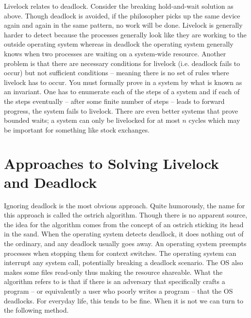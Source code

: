 Livelock relates to deadlock.
Consider the breaking hold-and-wait solution as above.
Though deadlock is avoided, if the philosopher picks up the same device again and again in the same pattern, no work will be done.
Livelock is generally harder to detect because the processes generally look like they are working to the outside operating system whereas in deadlock the operating system generally knows when two processes are waiting on a system-wide resource.
Another problem is that there are necessary conditions for livelock (i.e. deadlock fails to occur) but not sufficient conditions -- meaning there is no set of rules where livelock has to occur.
You must formally prove in a system by what is known as an invariant.
One has to enumerate each of the steps of a system and if each of the steps eventually -- after some finite number of steps -- leads to forward progress, the system fails to livelock.
There are even better systems that prove bounded waits; a system can only be livelocked for at most $n$ cycles which may be important for something like stock exchanges.

\section{Approaches to Solving Livelock and Deadlock}

Ignoring deadlock is the most obvious approach.
Quite humorously, the name for this approach is called the ostrich algorithm.
Though there is no apparent source, the idea for the algorithm comes from the concept of an ostrich sticking its head in the sand.
When the operating system detects deadlock, it does nothing out of the ordinary, and any deadlock usually goes away.
An operating system preempts processes when stopping them for context switches.
The operating system can interrupt any system call, potentially breaking a deadlock scenario.
The OS also makes some files read-only thus making the resource shareable.
What the algorithm refers to is that if there is an adversary that specifically crafts a program -- or equivalently a user who poorly writes a program -- that the OS deadlocks.
For everyday life, this tends to be fine.
When it is not we can turn to the following method.

